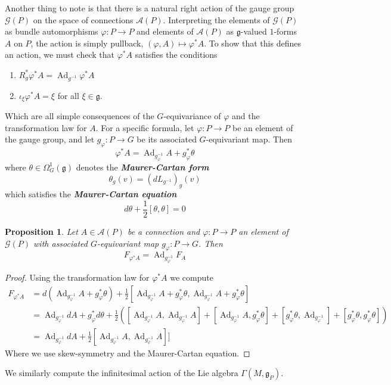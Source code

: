 \documentclass[psamsfonts, 12pt]{amsart}
\newtheorem{prop}[thm]{Proposition}
\theoremstyle{definition}
\theoremstyle{remark}
\newcommand{\ib}[1]{\textbf{\textit{#1}}}
\newcommand{\g}{\mathfrak{g}}
\newcommand{\inv}{^{-1}}
\DeclareMathOperator{\Ad}{Ad}
\begin{document}
Another thing to note is that there is a natural right action of the gauge group
$\mathscr{G}(P)$ on the space of connections $\mathscr{A}(P)$. Interpreting the
elements of $\mathscr{G}(P)$ as bundle automorphisms $\varphi : P \to P$ and
elements of $\mathscr{A}(P)$ as $\g$-valued $1$-forms $A$ on $P$, the action
is simply pullback, $(\varphi,A) \mapsto \varphi^*A$. To show that
this defines an action, we must check that $\varphi^*A$ satisfies the conditions
%
\begin{enumerate}
  \item $R_g^*\varphi^*A = \Ad_{g\inv} \varphi^*A$
  \item $\iota_\xi \varphi^*A = \xi$ for all $\xi \in \g$.
\end{enumerate}
%
Which are all simple consequences of the $G$-equivariance of $\varphi$ and
the transformation law for $A$. For a specific formula, let
$\varphi : P \to P$ be an element of the gauge group, and let
$g_\varphi : P \to G$ be its associated $G$-equivariant map. Then
\[
\varphi^*A = \Ad_{g_\varphi\inv} A + g_\varphi^*\theta
\]
where $\theta \in \Omega^1_G(\g)$ denotes the \ib{Maurer-Cartan form}
\[
\theta_g(v) = (dL_{g\inv})_g(v)
\]
which satisfies the \ib{Maurer-Cartan equation}
\[
d\theta + \frac{1}{2}[\theta,\theta] = 0
\]
%
\begin{prop}
Let $A \in \mathscr{A}(P)$ be a connection and $\varphi : P \to P$ an element
of $\mathscr{G}(P)$ with associated $G$-equivariant map $g_\varphi : P \to G$.
Then
\[
F_{\varphi^*A} = \Ad_{g_\varphi\inv} F_A
\]
\end{prop}
%
\begin{proof}
Using the transformation law for $\varphi^*A$ we compute
\begin{align*}
F_{\varphi^*A} &= d(\Ad_{g_\varphi\inv} A + g_\varphi^*\theta)
+ \frac{1}{2}[\Ad_{g_\varphi\inv} A + g_\varphi^*\theta,
\Ad_{g_\varphi\inv} A + g_\varphi^*\theta] \\
&= \Ad_{g_\varphi\inv}dA + g_\varphi^*d\theta + \frac{1}{2}
\left([\Ad_{g_\varphi\inv}A, \Ad_{g_\varphi\inv} A] + [\Ad_{g_\varphi\inv} A,
g_\varphi^*\theta] + [g^*_\varphi\theta, \Ad_{g_\varphi\inv}]
+ [g_\varphi^*\theta,g_\varphi^*\theta] \right) \\
&= \Ad_{g_\varphi\inv} dA + \frac{1}{2}[\Ad_{g_\varphi\inv}A, \Ad_{g_\varphi\inv} A]]
\end{align*}
Where we use skew-symmetry and the Maurer-Cartan equation.
\end{proof}
%
We similarly compute the infinitesimal action of the Lie algebra $\Gamma(M,\g_P)$.
\end{document}
